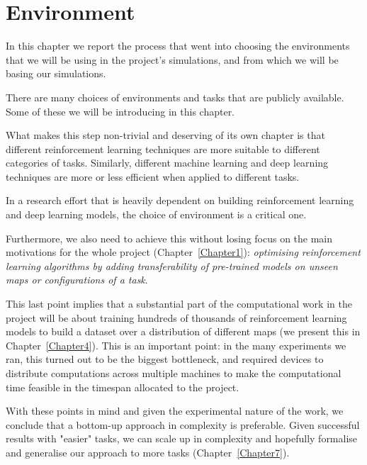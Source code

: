 
\chapter{Environment} %

\label{Chapter3} %


In this chapter we report the process that went into choosing the environments that we will be using in the project's simulations, and from which we will be basing our simulations.

There are many choices of environments and tasks that are publicly available. Some of these we will be introducing in this chapter.

What makes this step non-trivial and deserving of its own chapter is that different reinforcement learning techniques are more suitable to different categories of tasks. Similarly, different machine learning and deep learning techniques are more or less efficient when applied to different tasks.

In a research effort that is heavily dependent on building reinforcement learning and deep learning models, the choice of environment is a critical one.

Furthermore, we also need to achieve this without losing focus on the main motivations for the whole project (Chapter~\ref{Chapter1}): \textit{optimising reinforcement learning algorithms by adding transferability of pre-trained models on unseen maps or configurations of a task}.

This last point implies that a substantial part of the computational work in the project will be about training hundreds of thousands of reinforcement learning models to build a dataset over a distribution of different maps (we present this in Chapter~\ref{Chapter4}). This is an important point: in the many experiments we ran, this turned out to be the biggest bottleneck, and required devices to distribute computations across multiple machines to make the computational time feasible in the timespan allocated to the project.

With these points in mind and given the experimental nature of the work, we conclude that a bottom-up approach in complexity is preferable. Given successful results with "easier" tasks, we can scale up in complexity and hopefully formalise and generalise our approach to more tasks (Chapter~\ref{Chapter7}).

